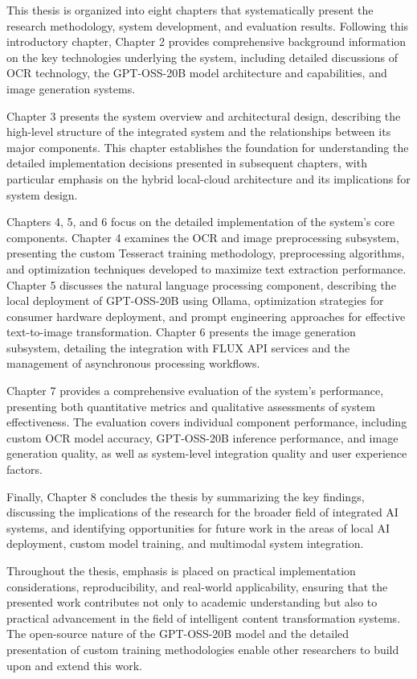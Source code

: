 This thesis is organized into eight chapters that systematically present the research methodology, system development, and evaluation results. Following this introductory chapter, Chapter 2 provides comprehensive background information on the key technologies underlying the system, including detailed discussions of OCR technology, the GPT-OSS-20B model architecture and capabilities, and image generation systems.

Chapter 3 presents the system overview and architectural design, describing the high-level structure of the integrated system and the relationships between its major components. This chapter establishes the foundation for understanding the detailed implementation decisions presented in subsequent chapters, with particular emphasis on the hybrid local-cloud architecture and its implications for system design.

Chapters 4, 5, and 6 focus on the detailed implementation of the system's core components. Chapter 4 examines the OCR and image preprocessing subsystem, presenting the custom Tesseract training methodology, preprocessing algorithms, and optimization techniques developed to maximize text extraction performance. Chapter 5 discusses the natural language processing component, describing the local deployment of GPT-OSS-20B using Ollama, optimization strategies for consumer hardware deployment, and prompt engineering approaches for effective text-to-image transformation. Chapter 6 presents the image generation subsystem, detailing the integration with FLUX API services and the management of asynchronous processing workflows.

Chapter 7 provides a comprehensive evaluation of the system's performance, presenting both quantitative metrics and qualitative assessments of system effectiveness. The evaluation covers individual component performance, including custom OCR model accuracy, GPT-OSS-20B inference performance, and image generation quality, as well as system-level integration quality and user experience factors.

Finally, Chapter 8 concludes the thesis by summarizing the key findings, discussing the implications of the research for the broader field of integrated AI systems, and identifying opportunities for future work in the areas of local AI deployment, custom model training, and multimodal system integration.


Throughout the thesis, emphasis is placed on practical implementation considerations, reproducibility, and real-world applicability, ensuring that the presented work contributes not only to academic understanding but also to practical advancement in the field of intelligent content transformation systems. The open-source nature of the GPT-OSS-20B model and the detailed presentation of custom training methodologies enable other researchers to build upon and extend this work.